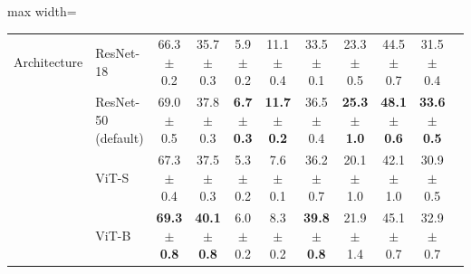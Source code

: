 \begin{table}[t]
\begin{adjustbox}{max width=\textwidth}
\begin{tabular}{l l c c c c c c c c c}
\midrule
Architecture & ResNet-18 & 66.3 {\scriptsize$\pm$ 0.2} & 35.7 {\scriptsize$\pm$ 0.3} & 5.9 {\scriptsize$\pm$ 0.2} & 11.1 {\scriptsize$\pm$ 0.4} & 33.5 {\scriptsize$\pm$ 0.1} & 23.3 {\scriptsize$\pm$ 0.5} & 44.5 {\scriptsize$\pm$ 0.7} & 31.5 {\scriptsize$\pm$ 0.4} \\
 & ResNet-50 (default) & 69.0 {\scriptsize$\pm$ 0.5} & 37.8 {\scriptsize$\pm$ 0.3} & \textbf{6.7 {\scriptsize$\pm$ 0.3}} & \textbf{11.7 {\scriptsize$\pm$ 0.2}} & 36.5 {\scriptsize$\pm$ 0.4} & \textbf{25.3 {\scriptsize$\pm$ 1.0}} & \textbf{48.1 {\scriptsize$\pm$ 0.6}} & \textbf{33.6 {\scriptsize$\pm$ 0.5}} \\
 & ViT-S & 67.3 {\scriptsize$\pm$ 0.4} & 37.5 {\scriptsize$\pm$ 0.3} & 5.3 {\scriptsize$\pm$ 0.2} & 7.6 {\scriptsize$\pm$ 0.1} & 36.2 {\scriptsize$\pm$ 0.7} & 20.1 {\scriptsize$\pm$ 1.0} & 42.1 {\scriptsize$\pm$ 1.0} & 30.9 {\scriptsize$\pm$ 0.5} \\
 & ViT-B & \textbf{69.3 {\scriptsize$\pm$ 0.8}} & \textbf{40.1 {\scriptsize$\pm$ 0.8}} & 6.0 {\scriptsize$\pm$ 0.2} & 8.3 {\scriptsize$\pm$ 0.2} & \textbf{39.8 {\scriptsize$\pm$ 0.8}} & 21.9 {\scriptsize$\pm$ 1.4} & 45.1 {\scriptsize$\pm$ 0.7} & 32.9 {\scriptsize$\pm$ 0.7} \\
\bottomrule
\end{tabular}
\end{adjustbox}
\end{table}

